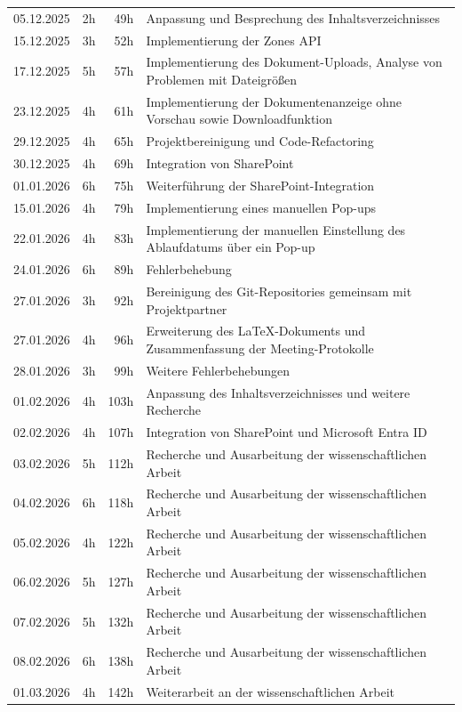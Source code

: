 \begin{longtable}{r | r | r | p{}}
    05.12.2025 & 2h & 49h & Anpassung und Besprechung des Inhaltsverzeichnisses \\
    15.12.2025 & 3h & 52h & Implementierung der Zones API \\
    17.12.2025 & 5h & 57h & Implementierung des Dokument-Uploads, Analyse von Problemen mit Dateigrößen \\
    23.12.2025 & 4h & 61h & Implementierung der Dokumentenanzeige ohne Vorschau sowie Downloadfunktion \\
    29.12.2025 & 4h & 65h & Projektbereinigung und Code-Refactoring \\
    30.12.2025 & 4h & 69h & Integration von SharePoint \\
    01.01.2026 & 6h & 75h & Weiterführung der SharePoint-Integration \\
    15.01.2026 & 4h & 79h & Implementierung eines manuellen Pop-ups \\
    22.01.2026 & 4h & 83h & Implementierung der manuellen Einstellung des Ablaufdatums über ein Pop-up \\
    24.01.2026 & 6h & 89h & Fehlerbehebung \\
    27.01.2026 & 3h & 92h & Bereinigung des Git-Repositories gemeinsam mit Projektpartner \\
    27.01.2026 & 4h & 96h & Erweiterung des LaTeX-Dokuments und Zusammenfassung der Meeting-Protokolle \\
    28.01.2026 & 3h & 99h & Weitere Fehlerbehebungen \\
    01.02.2026 & 4h & 103h & Anpassung des Inhaltsverzeichnisses und weitere Recherche \\
    02.02.2026 & 4h & 107h & Integration von SharePoint und Microsoft Entra ID \\
    03.02.2026 & 5h & 112h & Recherche und Ausarbeitung der wissenschaftlichen Arbeit \\
    04.02.2026 & 6h & 118h & Recherche und Ausarbeitung der wissenschaftlichen Arbeit \\
    05.02.2026 & 4h & 122h & Recherche und Ausarbeitung der wissenschaftlichen Arbeit \\
    06.02.2026 & 5h & 127h & Recherche und Ausarbeitung der wissenschaftlichen Arbeit \\
    07.02.2026 & 5h & 132h & Recherche und Ausarbeitung der wissenschaftlichen Arbeit \\
    08.02.2026 & 6h & 138h & Recherche und Ausarbeitung der wissenschaftlichen Arbeit \\
    01.03.2026 & 4h & 142h & Weiterarbeit an der wissenschaftlichen Arbeit \\

\end{longtable}
